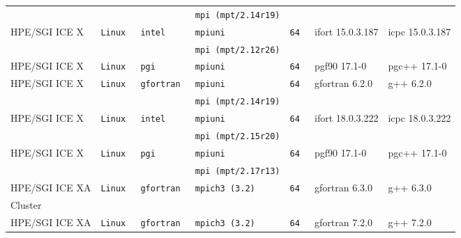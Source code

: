 \begin{longtable}{lllllll}
               &           &                 &\tt mpi \footnotesize (mpt/2.14r19)&                 &                                     &                                  \\
HPE/SGI ICE X  &\tt Linux  &\tt intel        &\tt mpiuni           &\tt 64           & ifort \footnotesize 15.0.3.187      & icpc \footnotesize 15.0.3.187    \\
               &           &                 &\tt mpi \footnotesize (mpt/2.12r26)&                 &                                     &                                  \\
HPE/SGI ICE X  &\tt Linux  &\tt pgi          &\tt mpiuni           &\tt 64           & pgf90 \footnotesize 17.1-0          & pgc++ \footnotesize 17.1-0       \\
HPE/SGI ICE X  &\tt Linux  &\tt gfortran     &\tt mpiuni           &\tt 64           & gfortran \footnotesize 6.2.0        & g++ \footnotesize 6.2.0          \\
               &           &                 &\tt mpi \footnotesize (mpt/2.14r19)&                 &                                     &                                  \\
HPE/SGI ICE X  &\tt Linux  &\tt intel        &\tt mpiuni           &\tt 64           & ifort \footnotesize 18.0.3.222      & icpc \footnotesize 18.0.3.222    \\
               &           &                 &\tt mpi \footnotesize (mpt/2.15r20)&                 &                                     &                                  \\
HPE/SGI ICE X  &\tt Linux  &\tt pgi          &\tt mpiuni           &\tt 64           & pgf90 \footnotesize 17.1-0          & pgc++ \footnotesize 17.1-0       \\
               &           &                 &\tt mpi \footnotesize (mpt/2.17r13)&                 &                                     &                                  \\
HPE/SGI ICE XA &\tt Linux  &\tt gfortran     &\tt mpich3 \footnotesize (3.2)     &\tt 64           & gfortran \footnotesize 6.3.0        & g++ \footnotesize 6.3.0          \\
Cluster        &           &                 &                     &                 &                                     &                                  \\
HPE/SGI ICE XA &\tt Linux  &\tt gfortran     &\tt mpich3 \footnotesize (3.2)     &\tt 64           & gfortran \footnotesize 7.2.0        & g++ \footnotesize 7.2.0          \\

\end{longtable}
